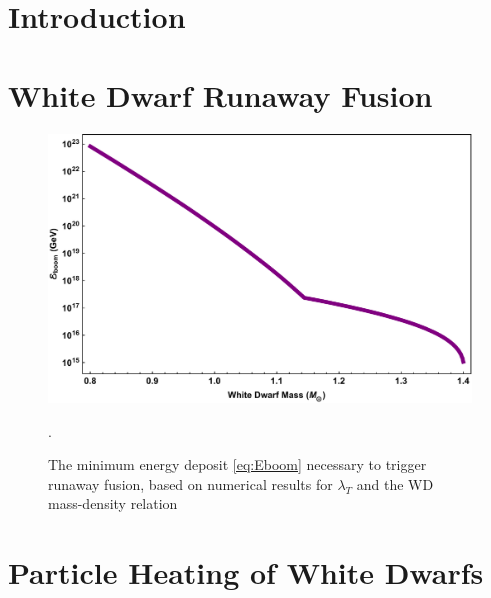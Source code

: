 \documentclass[twocolumn, preprintnumbers,amsmath,amssymb,prd, superscriptaddress]{revtex4}
\begin{document}
\section{Introduction}
\label{sec:intro}


\section{White Dwarf Runaway Fusion}
\label{sec:boomreview}


\begin{figure}
\includegraphics[scale=.3]{Eboom.pdf}
\caption{The minimum energy deposit \eqref{eq:Eboom} necessary to trigger runaway fusion, based on numerical results for $\lambda_T$ \cite{Woosley} and the WD mass-density relation \cite{cococubed}}.
\label{fig:Eboom}
\end{figure}

\section{Particle Heating of White Dwarfs}
\label{sec:smheating}
\end{document}
